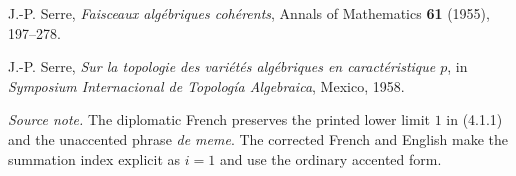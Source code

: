 \begin{enumerate}[label={\textup{[\arabic*]}},leftmargin=2.6em]
\item J.-P. Serre, \emph{Faisceaux algébriques cohérents}, Annals of
  Mathematics \textbf{61} (1955), 197--278.
\item J.-P. Serre, \emph{Sur la topologie des variétés algébriques en
  caractéristique $p$}, in \emph{Symposium Internacional de Topología
  Algebraica}, Mexico, 1958.
\end{enumerate}

\medskip
\noindent\emph{Source note.}
The diplomatic French preserves the printed lower limit $1$ in (4.1.1) and
the unaccented phrase \emph{de meme}.  The corrected French and English make
the summation index explicit as $i=1$ and use the ordinary accented form.
